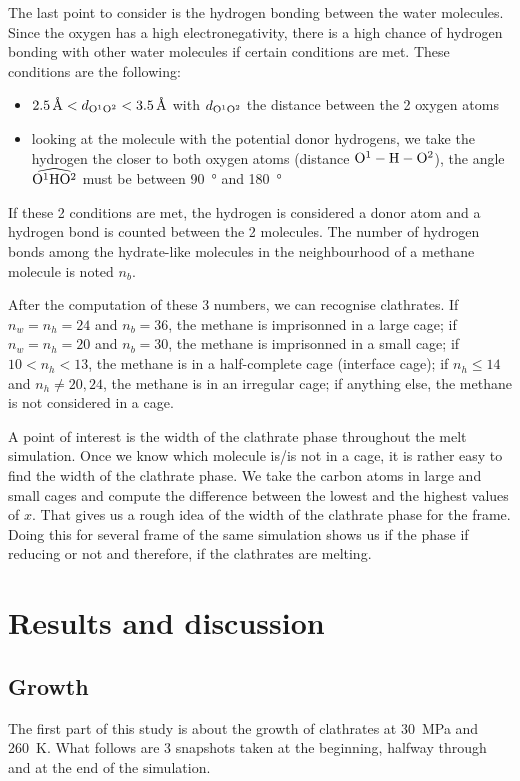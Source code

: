 The last point to consider is the hydrogen bonding between the water molecules. Since the oxygen has a high electronegativity, there is a high chance of hydrogen bonding with other water molecules if certain conditions are met. These conditions are the following:

\begin{itemize}
    \item $\SI{2.5}{\angstrom} < d_{\ce{O}^1\ce{O}^2} < \SI{3.5}{\angstrom}$ with $d_{\ce{O}^1\ce{O}^2}$ the distance between the 2 oxygen atoms 
    \item looking at the molecule with the potential donor hydrogens, we take the hydrogen the closer to both oxygen atoms (distance $\ce{O}^1-\ce{H}-\ce{O}^2$), the angle $\widehat{\ce{O}^1\ce{H}\ce{O}^2}$ must be between \SI{90}{\degree} and \SI{180}{\degree}
\end{itemize}
If these 2 conditions are met, the hydrogen is considered a donor atom and a hydrogen bond is counted between the 2 molecules. The number of hydrogen bonds among the hydrate-like molecules in the neighbourhood of a methane molecule is noted $n_b$.

After the computation of these 3 numbers, we can recognise clathrates. If $n_w = n_h = 24$ and $n_b = 36$, the methane is imprisonned in a large cage; if $n_w = n_h = 20$ and $n_b = 30$, the methane is imprisonned in a small cage; if $10 < n_h < 13$, the methane is in a half-complete cage (interface cage); if $n_h \leq 14$ and $n_h \neq 20, 24$, the methane is in an irregular cage; if anything else, the methane is not considered in a cage.

A point of interest is the width of the clathrate phase throughout the melt simulation. Once we know which molecule is/is not in a cage, it is rather easy to find the width of the clathrate phase. We take the carbon atoms in large and small cages and compute the difference between the lowest and the highest values of $x$. That gives us a rough idea of the width of the clathrate phase for the frame. Doing this for several frame of the same simulation shows us if the phase if reducing or not and therefore, if the clathrates are melting.

\newpage
\section{Results and discussion}

\subsection{Growth}
The first part of this study is about the growth of clathrates at \SI{30}{\mega\pascal} and \SI{260}{\kelvin}. What follows are 3 snapshots taken at the beginning, halfway through and at the end of the simulation.


